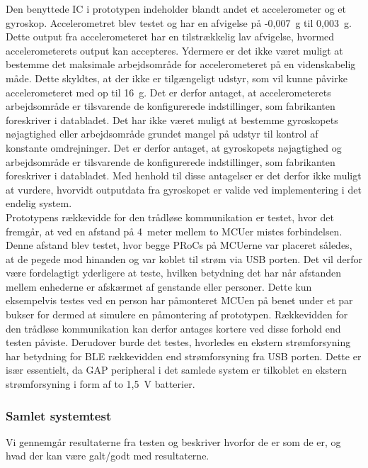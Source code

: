 Den benyttede IC i prototypen indeholder blandt andet et accelerometer og et gyroskop. Accelerometret blev testet og har en afvigelse på -0,007~g til 0,003~g. Dette output fra accelerometeret har en tilstrækkelig lav afvigelse, hvormed accelerometerets output kan accepteres. Ydermere er det ikke været muligt at bestemme det maksimale arbejdsområde for accelerometeret på en videnskabelig måde. Dette skyldtes, at der ikke er tilgængeligt udstyr, som vil kunne påvirke accelerometeret med op til 16~g. Det er derfor antaget, at accelerometerets arbejdsområde er tilsvarende de konfigurerede indstillinger, som fabrikanten foreskriver i databladet. Det har ikke været muligt at bestemme gyroskopets nøjagtighed eller arbejdsområde grundet mangel på udstyr til kontrol af konstante omdrejninger. Det er derfor antaget, at gyroskopets nøjagtighed og arbejdsområde er tilsvarende de konfigurerede indstillinger, som fabrikanten foreskriver i databladet. Med henhold til disse antagelser er det derfor ikke muligt at vurdere, hvorvidt outputdata fra gyroskopet er valide ved implementering i det endelig system. \\
Prototypens rækkevidde for den trådløse kommunikation er testet, hvor det fremgår, at ved en afstand på 4~meter mellem to MCUer mistes forbindelsen. Denne afstand blev testet, hvor begge PRoCs på MCUerne var placeret således, at de pegede mod hinanden og var koblet til strøm via USB porten. Det vil derfor være fordelagtigt yderligere at teste, hvilken betydning det har når afstanden mellem enhederne er afskærmet af genstande eller personer. Dette kun eksempelvis testes ved en person har påmonteret MCUen på benet under et par bukser for dermed at simulere en påmontering af prototypen. Rækkevidden for den trådløse kommunikation kan derfor antages kortere ved disse forhold end testen påviste. Derudover burde det testes, hvorledes en ekstern strømforsyning har betydning for BLE rækkevidden end strømforsyning fra USB porten. Dette er især essentielt, da GAP peripheral i det samlede system er tilkoblet en ekstern strømforsyning i form af to 1,5~V batterier.

\subsubsection{Samlet systemtest}
Vi gennemgår resultaterne fra testen og beskriver hvorfor de er som de er, og hvad der kan være galt/godt med resultaterne.

